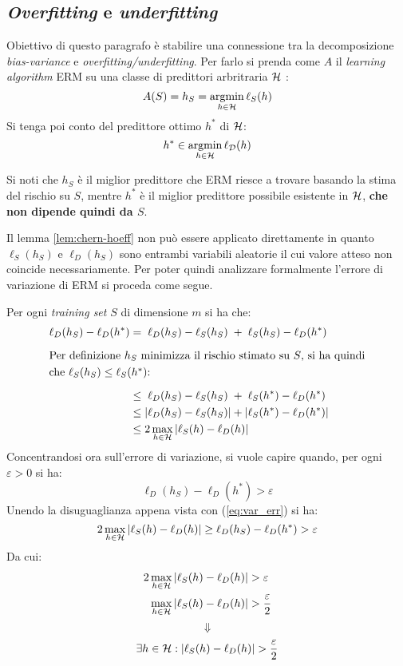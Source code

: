 \subsection{\textit{Overfitting} e \textit{underfitting}}
Obiettivo di questo paragrafo è stabilire una connessione tra la decomposizione
\textit{bias-variance} e \textit{overfitting/underfitting}. Per farlo si prenda come
$A$ il \textit{learning algorithm} ERM su una classe di predittori arbritraria 
$\mathcal{H}$  :
$$ A(S) = h_S = \operatorname*{argmin}_{h \in \mathcal{H}}\ell_S(h) $$
Si tenga poi conto del predittore ottimo $h^*$ di $\mathcal{H}$:
$$ h^* \in \operatorname*{argmin}_{h\in\mathcal{H}} \ell_{\mathcal{D}}(h) $$

Si noti che $h_S$ è il miglior predittore che ERM riesce a trovare basando la stima
del rischio su $S$, mentre $h^*$ è il miglior predittore possibile esistente in
$\mathcal{H}$, \textbf{che non dipende quindi da $S$}.

Il lemma \ref{lem:chern-hoeff} non può essere applicato direttamente in quanto 
$\ell_S(h_S)$ e $\ell_D(h_S)$ sono entrambi variabili aleatorie il cui valore atteso
non coincide necessariamente. Per poter quindi analizzare formalmente l'errore
di variazione di ERM si proceda come segue.

Per ogni \textit{training set} $S$ di dimensione $m$ si ha che:
\begin{align}
    \ell_D(h_S)-\ell_D(h^*) &= \phantom{|}\ell_D(h_S)-\ell_S(h_S)\phantom{|}
                +\phantom{|}\ell_S(h_S)-\ell_D(h^*) \notag\\[.6em]
                \multispan2{Per definizione $h_S$ minimizza il rischio stimato su $S$,
                si ha quindi\hfill}\notag\\
                \multispan2{che $\ell_S(h_S)\leq\ell_S(h^*)$:
                \hfill}\notag\\[.6em]
           &\leq\phantom{|}\ell_D(h_S)-\ell_S(h_S)\phantom{|}+\phantom{|}
                \ell_S(h^*)-\ell_D(h^*)\phantom{|} \notag\\
           &\leq |\ell_D(h_S)-\ell_S(h_S)|+|\ell_S(h^*)-\ell_D(h^*)| \notag\\
           &\leq 2\max_{h \in \Hpred} |\ell_S(h)-\ell_D(h)| \label{eq:var_err}
\end{align}
Concentrandosi ora sull'errore di variazione, si vuole capire quando, per ogni
$\varepsilon > 0$ si ha:
\begin{equation}
\ell_D(h_S)-\ell_D(h^*)>\varepsilon
\label{eq:var_err2}
\end{equation}
Unendo la disuguaglianza appena vista con (\ref{eq:var_err}) si ha:
$$
2\max_{h \in \mathcal{H}} |\ell_S(h)-\ell_D(h)| \geq \ell_D(h_S)-\ell_D(h^*)
> \varepsilon
$$
Da cui:
\begin{align}
    2\max_{h \in \mathcal{H}} |\ell_S(h)-\ell_D(h)| &> \varepsilon\notag\\
    \max_{h \in \mathcal{H}} |\ell_S(h)-\ell_D(h)| &> \frac{\varepsilon}{2}\label{eq:var_err3}
\end{align}
$$ \Downarrow $$
\begin{equation}
    \exists h \in \mathcal{H} : |\ell_S(h)-\ell_D(h)| > \frac{\varepsilon}{2}
    \label{eq:var_err4}
\end{equation}

